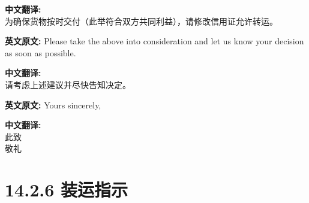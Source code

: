 \documentclass{ctexbeamer}
\begin{document}
\begin{frame}[allowframebreaks]
\smallskip
\textbf{中文翻译:}\\
为确保货物按时交付（此举符合双方共同利益），请修改信用证允许转运。

\medskip
\textbf{英文原文:}
Please take the above into consideration and let us know your decision as soon as possible.

\smallskip
\textbf{中文翻译:}\\
请考虑上述建议并尽快告知决定。

\medskip
\textbf{英文原文:}
Yours sincerely,

\smallskip
\textbf{中文翻译:}\\
此致\\
敬礼
\end{frame}

\section{14.2.6 装运指示}
\end{document}
